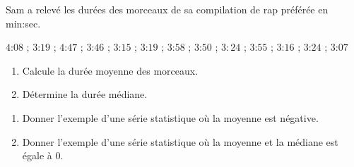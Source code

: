 \documentclass[a4paper,10pt]{report}
\begin{document}
\begin{ex}
Sam a relevé les durées des morceaux de sa compilation de rap préférée en min:sec.

\medskip
\noindent $4$:$08$ \quad ; \quad $3$:$19$ \quad ; \quad $4$:$47$ \quad ; \quad $3$:$46$ \quad ; \quad $3$:$15$ \quad ; \quad $3$:$19$ \quad ; \quad $3$:$58$ \quad ; \quad $3$:$50$ \quad ; \quad $3:24$ \quad ; \quad $3$:$55$ \quad ; \quad $3$:$16$ \quad ; \quad $3$:$24$ \quad ; \quad $3$:$07$ 

\begin{enumerate}[font=\color{exer3}]
\item Calcule la durée moyenne des morceaux.
\item Détermine la durée médiane.
\end{enumerate}
\end{ex}

\begin{ex}

\medskip
\begin{enumerate}[font=\color{exer3}]
\item Donner l'exemple d'une série statistique où la moyenne est négative.
\item Donner l'exemple d'une série statistique où la moyenne et la médiane est égale à $0$.
\end{enumerate}
\end{ex}
\end{document}
